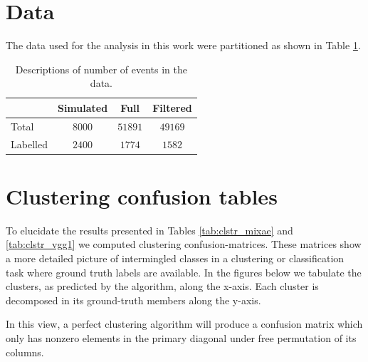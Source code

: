 \documentclass[preprint,12pt]{elsarticle}
\begin{document}
\section{Data}

The data used  for the analysis in this work were partitioned as shown in Table \ref{tab:data sets}. 
\begin{table}[hbtp]
\centering
\caption{Descriptions of number of events in the data.}\label{tab:data sets}
\begin{tabular}{lccc}
\toprule
{} & Simulated & Full & Filtered \\
\midrule
Total &  $8000$ & $51891$ & $49169$ \\
Labelled & $2400$ & $1774$ &  $1582$ \\ 
\bottomrule
\end{tabular}
\end{table}

\section{Clustering confusion tables}

To elucidate the results presented in Tables \ref{tab:clstr_mixae} and \ref{tab:clstr_vgg1} we computed clustering confusion-matrices. These matrices show a more detailed picture of intermingled classes in a clustering or classification task where ground truth labels are available. In the figures below we tabulate the clusters, as predicted by the algorithm, along the x-axis. Each cluster is decomposed in its ground-truth members along the y-axis.

In this view, a perfect clustering algorithm will produce a confusion matrix which only has nonzero elements in the primary diagonal under free permutation of its columns. 
\end{document}
